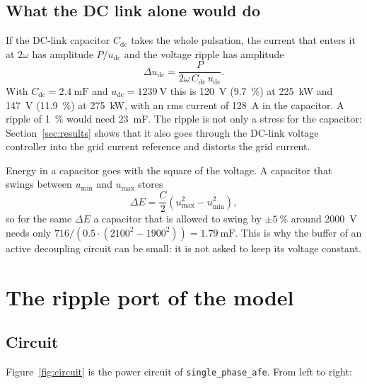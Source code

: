\documentclass[11pt,a4paper]{scrartcl}
\newcommand{\ped}[1]{_{\mathrm{#1}}}
\newcommand{\code}[1]{\texttt{#1}}
\begin{document}
\begin{onehalfspace}
\subsection{What the DC link alone would do}

If the DC-link capacitor $C\ped{dc}$ takes the whole pulsation, the current that enters it at $2\omega$ has amplitude $P/u\ped{dc}$ and the voltage ripple has amplitude
\begin{equation}
	\Delta u\ped{dc} = \frac{P}{2\omega\, C\ped{dc}\, u\ped{dc}}.
	\label{eq:ripple}
\end{equation}
With $C\ped{dc} = \SI{2.4}{\milli\farad}$ and $u\ped{dc} = \SI{1239}{\volt}$ this is \SI{120}{\volt} (\SI{9.7}{\percent}) at \SI{225}{\kilo\watt} and \SI{147}{\volt} (\SI{11.9}{\percent}) at \SI{275}{\kilo\watt}, with an rms current of \SI{128}{\ampere} in the capacitor. A ripple of \SI{1}{\percent} would need \SI{23}{\milli\farad}. The ripple is not only a stress for the capacitor: Section~\ref{sec:results} shows that it also goes through the DC-link voltage controller into the grid current reference and distorts the grid current.

Energy in a capacitor goes with the square of the voltage. A capacitor that swings between $u\ped{min}$ and $u\ped{max}$ stores
\begin{equation}
	\Delta E = \frac{C}{2}\left(u\ped{max}^2 - u\ped{min}^2\right),
	\label{eq:cap_energy}
\end{equation}
so for the same $\Delta E$ a capacitor that is allowed to swing by $\pm\SI{5}{\percent}$ around \SI{2000}{\volt} needs only $716 / (0.5 \cdot (2100^2 - 1900^2)) = \SI{1.79}{\milli\farad}$. This is why the buffer of an active decoupling circuit can be small: it is not asked to keep its voltage constant.

\section{The ripple port of the model}
\label{sec:circuit}

\subsection{Circuit}

Figure~\ref{fig:circuit} is the power circuit of \code{single\_phase\_afe}. From left to right:


\end{onehalfspace}
\end{document}
